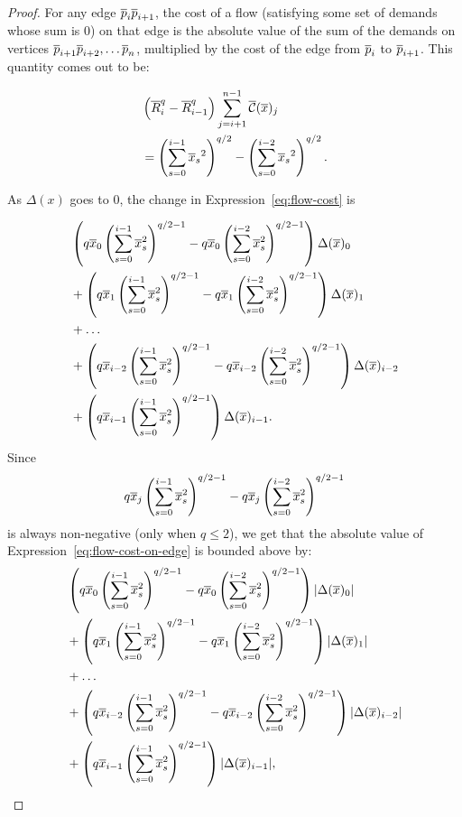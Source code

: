 \begin{proof} For any edge $\overline{p}_i\overline{p}_{i+1}$, the cost of a flow (satisfying
some set of demands whose sum is $0$) on that edge is the absolute value of
the sum of the demands on vertices $\overline{p}_{i+1} \overline{p}_{i+2}, \ldots \overline{p}_n$,
multiplied by the cost of the edge from $\overline{p}_i$ to $\overline{p}_{i+1}$. This
quantity comes out to be:

\begin{align} &\left(\overline{R}_{i}^q-\overline{R}_{i-1}^q \right) \sum_{j=i+1}^{n-1} \overline{\mathcal{C}}(\overline{x})_j
\\
\label{eq:flow-cost}
&=\left(\sum_{s=0}^{i-1} {\overline{x}_s}^2\right)^{q/2} -\left(\sum_{s=0}^{i-2}
{\overline{x}_s}^2\right)^{q/2}.
\end{align}

As $\Delta(x)$ goes to $0$, the change in Expression~\ref{eq:flow-cost} is

\begin{align}
\begin{split}
\label{eq:flow-cost-on-edge}
&
\left(q\overline{x}_0 \left(\sum_{s=0}^{i-1} \overline{x}_s^2 \right)^{q/2-1} -
q\overline{x}_0\left(\sum_{s=0}^{i-2} \overline{x}_s^2 \right)^{q/2-1} \right) \Delta(\overline{x})_0
\\
&+
\left(q\overline{x}_1 \left(\sum_{s=0}^{i-1} \overline{x}_s^2 \right)^{q/2-1} -
q\overline{x}_1\left(\sum_{s=0}^{i-2}\overline{x}_s^2 \right)^{q/2-1} \right) \Delta(\overline{x})_1
\\
&+ \ldots
\\
&+
\left(q\overline{x}_{i-2} \left(\sum_{s=0}^{i-1} \overline{x}_s^2 \right)^{q/2-1} -
q\overline{x}_{i-2}\left(\sum_{s=0}^{i-2}\overline{x}_s^2 \right)^{q/2-1}
\right)\Delta(\overline{x})_{i-2}
\\
&+
\left(q\overline{x}_{i-1} \left(\sum_{s=0}^{i-1} \overline{x}_s^2
\right)^{q/2-1}\right)\Delta(\overline{x})_{i-1}.
\end{split}
\end{align}
Since 
\[
q\overline{x}_j\left(\sum_{s=0}^{i-1} \overline{x}_s^2\right)^{q/2-1} - q\overline{x}_j\left(\sum_{s=0}^{i-2}
\overline{x}_s^2 \right)^{q/2-1}\]
is always non-negative (only when $q \leq 2$), we get that the absolute value of
Expression~\ref{eq:flow-cost-on-edge} is bounded above by:
\begin{align}
\begin{split}
\label{eq:flow-cost-upper-bound}
&
\left(q\overline{x}_0 \left(\sum_{s=0}^{i-1} \overline{x}_s^2 \right)^{q/2-1} -
q\overline{x}_0\left(\sum_{s=0}^{i-2} \overline{x}_s^2 \right)^{q/2-1} \right)
|\Delta(\overline{x})_0|
\\
&+
\left(q\overline{x}_1 \left(\sum_{s=0}^{i-1} \overline{x}_s^2 \right)^{q/2-1} -
q\overline{x}_1\left(\sum_{s=0}^{i-2}\overline{x}_s^2 \right)^{q/2-1} \right) |\Delta(\overline{x})_1|
\\
&+ \ldots
\\
&+
\left(q\overline{x}_{i-2} \left(\sum_{s=0}^{i-1} \overline{x}_s^2 \right)^{q/2-1} -
q\overline{x}_{i-2}\left(\sum_{s=0}^{i-2}\overline{x}_s^2 \right)^{q/2-1}
\right)|\Delta(\overline{x})_{i-2}|
\\
&+
\left(q\overline{x}_{i-1} \left(\sum_{s=0}^{i-1} \overline{x}_s^2
\right)^{q/2-1}\right)|\Delta(\overline{x})_{i-1}|,
\end{split}
\end{align}


\end{proof}
